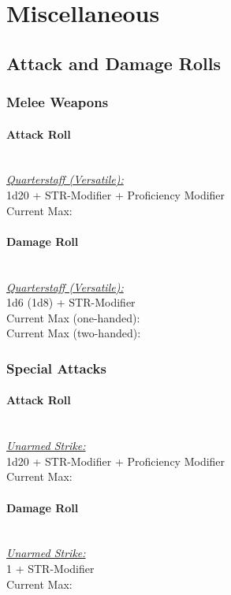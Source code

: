 {\section*{Miscellaneous}
\subsection*{Attack and Damage Rolls}
\subsubsection*{Melee Weapons}
\paragraph*{Attack Roll}\hfill\\
\underline{\textit{Quarterstaff (Versatile):}}\\
1d20 + STR-Modifier + Proficiency Modifier\\
\indent Current Max: 
\paragraph*{Damage Roll}\hfill\\
\underline{\textit{Quarterstaff (Versatile):}}\\
1d6 (1d8) + STR-Modifier\\
\indent Current Max (one-handed): \\
\indent Current Max (two-handed): 
\subsubsection*{Special Attacks}
\paragraph*{Attack Roll}\hfill\\
\underline{\textit{Unarmed Strike:}}\\
1d20 + STR-Modifier + Proficiency Modifier\\
\indent Current Max: 
\paragraph*{Damage Roll}\hfill\\
\underline{\textit{Unarmed Strike:}}\\
1 + STR-Modifier\\
\indent Current Max: 
}